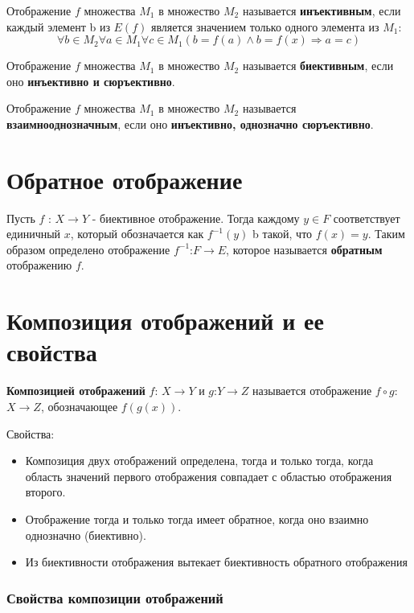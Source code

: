 \documentclass[a4paper]{article}
\begin{document}
{\begin{small}
Отображение $f$ множества $M_1$ в множество $M_2$ называется
\textbf{инъективным}, если каждый элемент b из $E(f)$ является значением только одного элемента из $M_1$:
\begin{equation}
\forall b \in M_2 \forall a \in M_1 \forall c \in M_1 (b = f(a) \land b = f(x) \Rightarrow a = c)
\end{equation}

Отображение $f$ множества $M_1$ в множество $M_2$ называется
\textbf{биективным}, если оно \textbf{инъективно и сюръективно}. 

Отображение $f$ множества $M_1$ в множество $M_2$ называется
\textbf{взаимнооднозначным}, если оно \textbf{инъективно, однозначно сюръективно}.

\section*{Обратное отображение
}
Пусть $f$ : $X \rightarrow Y$ - биективное отображение. Тогда каждому $y \in F$ соответствует единичный $x$, который обозначается как $f^{-1} (y)$ b такой, что $f(x) = y$. Таким образом определено отображение $f^{-1}$:$F \rightarrow E$, которое называется \textbf{обратным} отображению $f$.

\section*{Композиция отображений и ее свойства}
\textbf{Композицией отображений} $f$: $X \rightarrow Y$ и $g$:$Y \rightarrow Z$ называется отображение $f \circ g$: $X \rightarrow Z$, обозначающее $f(g(x))$.

Свойства:
\begin{itemize}
\item Композиция двух отображений определена, тогда и только тогда, когда область значений первого отображения совпадает с областью отображения второго.
\item Отображение тогда и только тогда
имеет обратное, когда оно взаимно однозначно (биективно).
\item Из биективности отображения вытекает биективность обратного отображения
\end{itemize}


\subsubsection*{Свойства композиции отображений}


\end{small}}
\end{document}
